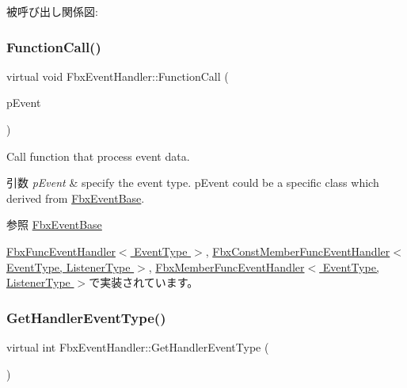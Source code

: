 被呼び出し関係図\+:
\mbox{\label{class_fbx_event_handler_a46357ba45116a30c8f53c3e5fe9ba2fb}} 
\subsubsection{\texorpdfstring{Function\+Call()}{FunctionCall()}}
{\footnotesize\ttfamily virtual void Fbx\+Event\+Handler\+::\+Function\+Call (\begin{DoxyParamCaption}\item[{const \hyperlink{class_fbx_event_base}{Fbx\+Event\+Base} \&}]{p\+Event }\end{DoxyParamCaption})\hspace{0.3cm}{\ttfamily [pure virtual]}}

Call function that process event data. 
\begin{DoxyParams}{引数}
{\em p\+Event} & specify the event type. p\+Event could be a specific class which derived from \hyperlink{class_fbx_event_base}{Fbx\+Event\+Base}. \\
\hline
\end{DoxyParams}
\begin{DoxySeeAlso}{参照}
\hyperlink{class_fbx_event_base}{Fbx\+Event\+Base} 
\end{DoxySeeAlso}


\hyperlink{class_fbx_func_event_handler_a6111e1a7e1a0e60170a2de498fe44766}{Fbx\+Func\+Event\+Handler$<$ Event\+Type $>$}, \hyperlink{class_fbx_const_member_func_event_handler_ae6c6805404e8045de40289893709dc54}{Fbx\+Const\+Member\+Func\+Event\+Handler$<$ Event\+Type, Listener\+Type $>$}, \hyperlink{class_fbx_member_func_event_handler_a4bcb037442927d480776bc2fb4b7bcd6}{Fbx\+Member\+Func\+Event\+Handler$<$ Event\+Type, Listener\+Type $>$}で実装されています。

\mbox{\label{class_fbx_event_handler_a0b42d2b93e63d866975f468a481c9f3c}} 
\subsubsection{\texorpdfstring{Get\+Handler\+Event\+Type()}{GetHandlerEventType()}}
{\footnotesize\ttfamily virtual int Fbx\+Event\+Handler\+::\+Get\+Handler\+Event\+Type (\begin{DoxyParamCaption}{ }\end{DoxyParamCaption})\hspace{0.3cm}{\ttfamily [pure virtual]}}

